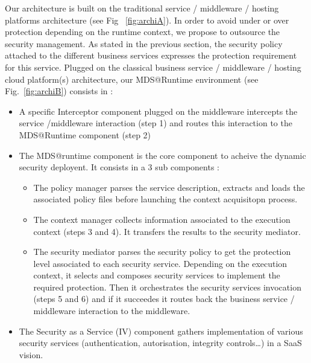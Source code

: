 \documentclass[runningheads,a4paper]{llncs}
\begin{document}
Our architecture is built on the traditional service / middleware / hosting platforms architecture (see Fig ~\ref{fig:archiA}). In order to avoid under or over protection depending on the runtime context, we propose to outsource the security management. As stated in the previous section, the security policy attached to the different business services expresses the protection requirement for this service. Plugged on the classical business service / middleware / hosting cloud platform(s) architecture, our MDS@Runtime environment (see Fig.~\ref{fig:archiB}) consists in :

\begin{itemize}
\settowidth{\leftmargin}{{\Large$\square$}}\advance\leftmargin{}
\itemsep5pt\relax
\renewcommand\labelitemi{{\lower1.5pt\hbox{\Large$\square$}}}
\item A specific Interceptor component plugged on the middleware intercepts the service /middleware interaction (step 1) and routes this interaction to the MDS@Runtime component (step 2) 
\item	The MDS@runtime component  is the core component to acheive the dynamic security deployent. It consists in a 3 sub components : 
\begin{itemize}
\item	The policy manager parses the service description, extracts and loads the associated policy files before launching the context acquisitopn process.
\item The context manager collects information associated to the execution context (steps 3 and 4). It transfers the results to the security mediator.
\item	The security mediator parses the security policy to get the protection level associated to each security service. Depending on the execution context, it selects and composes security services to implement the required protection. Then it orchestrates the security services invocation (steps 5 and 6) and if it succeedes it routes back the business service / middleware interaction to the middleware.
\end{itemize}
\item The Security as a Service (IV) component gathers implementation of various security services (authentication, autorisation, integrity controls…) in a SaaS vision.
\end{itemize}
\end{document}
